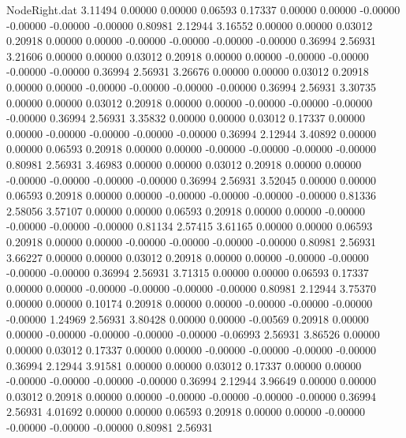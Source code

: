\begin{filecontents}{NodeRight.dat}
   3.11494    0.00000    0.00000     0.06593    0.17337    0.00000    0.00000   -0.00000   -0.00000   -0.00000   -0.00000    0.80981    2.12944
   3.16552    0.00000    0.00000     0.03012    0.20918    0.00000    0.00000   -0.00000   -0.00000   -0.00000   -0.00000    0.36994    2.56931
   3.21606    0.00000    0.00000     0.03012    0.20918    0.00000    0.00000   -0.00000   -0.00000   -0.00000   -0.00000    0.36994    2.56931
   3.26676    0.00000    0.00000     0.03012    0.20918    0.00000    0.00000   -0.00000   -0.00000   -0.00000   -0.00000    0.36994    2.56931
   3.30735    0.00000    0.00000     0.03012    0.20918    0.00000    0.00000   -0.00000   -0.00000   -0.00000   -0.00000    0.36994    2.56931
   3.35832    0.00000    0.00000     0.03012    0.17337    0.00000    0.00000   -0.00000   -0.00000   -0.00000   -0.00000    0.36994    2.12944
   3.40892    0.00000    0.00000     0.06593    0.20918    0.00000    0.00000   -0.00000   -0.00000   -0.00000   -0.00000    0.80981    2.56931
   3.46983    0.00000    0.00000     0.03012    0.20918    0.00000    0.00000   -0.00000   -0.00000   -0.00000   -0.00000    0.36994    2.56931
   3.52045    0.00000    0.00000     0.06593    0.20918    0.00000    0.00000   -0.00000   -0.00000   -0.00000   -0.00000    0.81336    2.58056
   3.57107    0.00000    0.00000     0.06593    0.20918    0.00000    0.00000   -0.00000   -0.00000   -0.00000   -0.00000    0.81134    2.57415
   3.61165    0.00000    0.00000     0.06593    0.20918    0.00000    0.00000   -0.00000   -0.00000   -0.00000   -0.00000    0.80981    2.56931
   3.66227    0.00000    0.00000     0.03012    0.20918    0.00000    0.00000   -0.00000   -0.00000   -0.00000   -0.00000    0.36994    2.56931
   3.71315    0.00000    0.00000     0.06593    0.17337    0.00000    0.00000   -0.00000   -0.00000   -0.00000   -0.00000    0.80981    2.12944
   3.75370    0.00000    0.00000     0.10174    0.20918    0.00000    0.00000   -0.00000   -0.00000   -0.00000   -0.00000    1.24969    2.56931
   3.80428    0.00000    0.00000    -0.00569    0.20918    0.00000    0.00000   -0.00000   -0.00000   -0.00000   -0.00000   -0.06993    2.56931
   3.86526    0.00000    0.00000     0.03012    0.17337    0.00000    0.00000   -0.00000   -0.00000   -0.00000   -0.00000    0.36994    2.12944
   3.91581    0.00000    0.00000     0.03012    0.17337    0.00000    0.00000   -0.00000   -0.00000   -0.00000   -0.00000    0.36994    2.12944
   3.96649    0.00000    0.00000     0.03012    0.20918    0.00000    0.00000   -0.00000   -0.00000   -0.00000   -0.00000    0.36994    2.56931
   4.01692    0.00000    0.00000     0.06593    0.20918    0.00000    0.00000   -0.00000   -0.00000   -0.00000   -0.00000    0.80981    2.56931

\end{filecontents}
